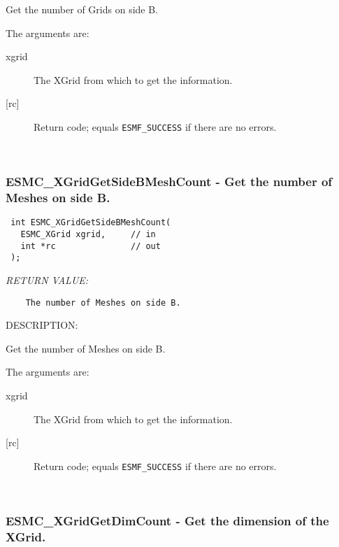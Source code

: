   
    Get the number of Grids on side B. 
  
    The arguments are:
    \begin{description}
    \item[xgrid]
      The XGrid from which to get the information.
    \item[{[rc]}]
      Return code; equals {\tt ESMF\_SUCCESS} if there are no errors.
    \end{description}
   
 
\mbox{}\hrulefill\ 
 
\subsubsection [ESMC\_XGridGetSideBMeshCount] {ESMC\_XGridGetSideBMeshCount - Get the number of Meshes on side B.}


  
\begin{verbatim} int ESMC_XGridGetSideBMeshCount(
   ESMC_XGrid xgrid,     // in
   int *rc               // out
 );
 \end{verbatim}{\em RETURN VALUE:}
\begin{verbatim}    The number of Meshes on side B. \end{verbatim}
{\sf DESCRIPTION:\\ }


  
    Get the number of Meshes on side B. 
  
    The arguments are:
    \begin{description}
    \item[xgrid]
      The XGrid from which to get the information.
    \item[{[rc]}]
      Return code; equals {\tt ESMF\_SUCCESS} if there are no errors.
    \end{description}
   
 
\mbox{}\hrulefill\ 
 
\subsubsection [ESMC\_XGridGetDimCount] {ESMC\_XGridGetDimCount - Get the dimension of the XGrid.}


